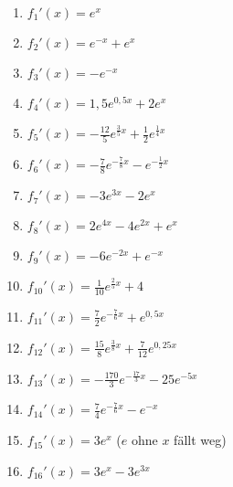 \begin{Answer}[ref=efktAblA1]

	\begin{minipage}{\textwidth}
		\begin{minipage}{0.5\textwidth}
			\begin{enumerate}[label=\alph*)]
				\item \(f_1'(x)=e^x\)
				\item \(f_2'(x)=e^{-x}+e^x\)
				\item \(f_3'(x)=-e^{-x}\)
				\item \(f_4'(x)=1,5e^{0,5x}+2e^x\)
				\item \(f_5'(x)=-\frac{12}{5}e^{\frac{3}{5}x}+\frac{1}{2}e^{\frac{1}{4}x}\)
				\item \(f_6'(x)=-\frac{7}{8}e^{-\frac{7}{8}x}-e^{-\frac{1}{2}x}\)
				\item \(f_7'(x)=-3e^{3x}-2e^{x}\)
				\item \(f_8'(x)=2e^{4x}-4e^{2x}+e^x\)
			\end{enumerate}
		\end{minipage}%
		\begin{minipage}{0.5\textwidth}
			\begin{enumerate}[label=\alph*)]
				\setcounter{enumi}{8}
				\item \(f_9'(x)=-6e^{-2x}+e^{-x}\)
				\item \(f_{10}'(x)=\frac{1}{10}e^{\frac{2}{5}x}+4\)
				\item \(f_{11}'(x)=\frac{7}{2}e^{-\frac{7}{6}x}+e^{0,5x}\)
				\item \(f_{12}'(x)=\frac{15}{8}e^{\frac{3}{8}x}+\frac{7}{12}e^{0,25x}\)
				\item \(f_{13}'(x)=-\frac{170}{3}e^{-\frac{17}{3}x}-25e^{-5x}\)
				\item \(f_{14}'(x)=\frac{7}{4}e^{-\frac{7}{6}x}-e^{-x}\)
				\item \(f_{15}'(x)=3e^x\) (\(e\) ohne \(x\) fällt weg)
				\item \(f_{16}'(x)=3e^x-3e^{3x}\)
			\end{enumerate}
		\end{minipage}%
	\end{minipage}
\end{Answer}
